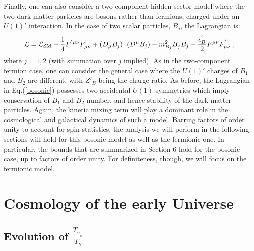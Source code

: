 \documentclass[12pt]{article}
\begin{document}
Finally, one can also consider a two-component hidden sector model where the two dark matter particles are bosons rather than fermions, charged under an $U(1)'$ interaction. In the case of two scalar particles, $B _j$, the Lagrangian is:
%
\begin{eqnarray}
{\cal L} = {\cal L} _{\text{SM}} - \frac{1}{4}F ^{'\mu \nu}F ^{'} _{\mu \nu} + \left ( D _{\mu}B _j \right ) ^{\dagger}\left ( D ^{\mu}B _j \right ) - m _{B _j} ^2B _j ^{\dagger}B _j - \frac{\epsilon ^{'} _B}{2}F ^{\mu \nu} F _{\mu \nu} ^{'} \ ,
\label{bosonic}
\end{eqnarray}
%
where $j=1,2$ (with summation over $j$ implied). As in the two-component fermion case, one can consider the general case where the $U(1)'$ charges of $B _1$ and $B _2$ are different, with $Z' _B$ being the charge ratio. As before, the Lagrangian in Eq.(\ref{bosonic}) possesses two accidental $U(1)$ symmetries which imply conservation of $B _1$ and $B _2$ number, and hence stability of the dark matter particles. Again, the kinetic mixing term will play a dominant role in the cosmological and galactical dynamics of such a model. Barring factors of order unity to account for spin statistics, the analysis we will perform in the following sections will hold for this bosonic model as well as the fermionic one. In particular, the bounds that are summarized in Section 6 hold for the bosonic case, up to factors of order unity. For definiteness, though, we will focus on the fermionic model.

\section{Cosmology of the early Universe}

\subsection{Evolution of $\frac{T _{\gamma _{_D}}}{T _{\gamma}}$}
\end{document}
